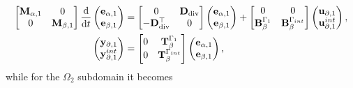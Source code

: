 \documentclass[11pt,a4paper]{article}
\renewcommand{\div}{\operatorname{div}}
\begin{document}
\begin{equation}
    \begin{split}
        \begin{bmatrix}
            \mathbf{M}_{\alpha, 1} & 0 \\
            0 & \mathbf{M}_{\beta, 1}
        \end{bmatrix}\odv{}{t}
        \begin{pmatrix}
            \mathbf{e}_{\alpha,1} \\
            \mathbf{e}_{\beta,1}
        \end{pmatrix} &= 
        \begin{bmatrix}
            0 & \mathbf{D}_{\div} \\
            -\mathbf{D}_{\div}^\top & 0 
        \end{bmatrix}
        \begin{pmatrix}
            \mathbf{e}_{\alpha,1} \\
            \mathbf{e}_{\beta,1}
        \end{pmatrix} + 
        \begin{bmatrix}
            0 & 0 \\
            \mathbf{B}_{\beta}^{\Gamma_1} & \mathbf{B}_{\beta}^{\Gamma_{\rm int}}
        \end{bmatrix}
        \begin{pmatrix}
            \mathbf{u}_{\partial,1} \\
            \mathbf{u}_{\partial,1}^{\rm int}
        \end{pmatrix}, \\
        \begin{pmatrix}
            \mathbf{y}_{\partial,1} \\
            \mathbf{y}_{\partial,1}^{\rm int}
        \end{pmatrix} &= 
        \begin{bmatrix}
            0 & \mathbf{T}_\beta^{\Gamma_1} \\
            0 & \mathbf{T}_\beta^{\Gamma_{\rm int}}
        \end{bmatrix}
        \begin{pmatrix}
            \mathbf{e}_{\alpha,1} \\
            \mathbf{e}_{\beta,1}
        \end{pmatrix},
    \end{split}
\end{equation}
while for the $\Omega_2$ subdomain it becomes
\end{document}
